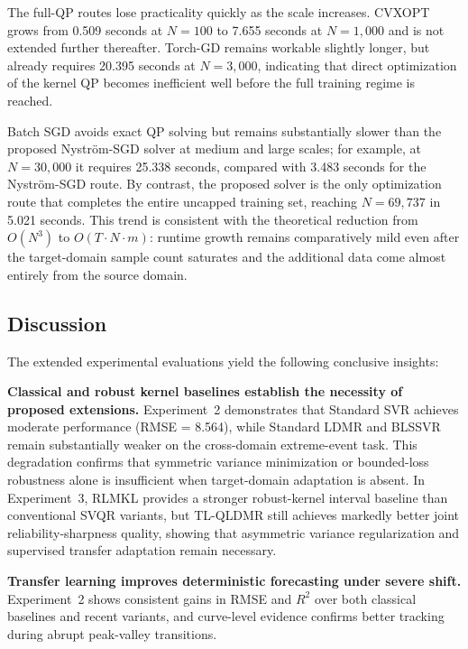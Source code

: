 The full-QP routes lose practicality quickly as the scale increases. CVXOPT grows from 0.509 seconds at $N=100$ to 7.655 seconds at $N=1{,}000$ and is not extended further thereafter. Torch-GD remains workable slightly longer, but already requires 20.395 seconds at $N=3{,}000$, indicating that direct optimization of the kernel QP becomes inefficient well before the full training regime is reached.

Batch SGD avoids exact QP solving but remains substantially slower than the proposed Nystr\"{o}m-SGD solver at medium and large scales; for example, at $N=30{,}000$ it requires 25.338 seconds, compared with 3.483 seconds for the Nystr\"{o}m-SGD route. By contrast, the proposed solver is the only optimization route that completes the entire uncapped training set, reaching $N=69{,}737$ in 5.021 seconds. This trend is consistent with the theoretical reduction from $O(N^3)$ to $O(T \cdot N \cdot m)$: runtime growth remains comparatively mild even after the target-domain sample count saturates and the additional data come almost entirely from the source domain. 

\subsection{Discussion}\label{sec:discussion}

The extended experimental evaluations yield the following conclusive insights:

\textbf{Classical and robust kernel baselines establish the necessity of proposed extensions.} Experiment~2 demonstrates that Standard SVR achieves moderate performance (RMSE = 8.564), while Standard LDMR and BLSSVR remain substantially weaker on the cross-domain extreme-event task. This degradation confirms that symmetric variance minimization or bounded-loss robustness alone is insufficient when target-domain adaptation is absent. In Experiment~3, RLMKL provides a stronger robust-kernel interval baseline than conventional SVQR variants, but TL-QLDMR still achieves markedly better joint reliability-sharpness quality, showing that asymmetric variance regularization and supervised transfer adaptation remain necessary.

\textbf{Transfer learning improves deterministic forecasting under severe shift.} Experiment~2 shows consistent gains in RMSE and $R^2$ over both classical baselines and recent variants, and curve-level evidence confirms better tracking during abrupt peak-valley transitions.

